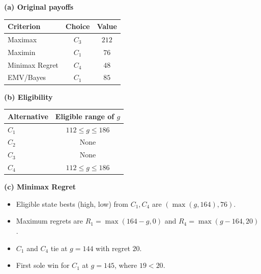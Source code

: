 {\noindent\begin{minipage}[t]{0.35\textwidth}
  \vspace{0pt}
  \textbf{(a) Original payoffs}\par\smallskip
  \setlength{\tabcolsep}{3pt}
  \begin{tabular}{@{}lcc@{}}
    \toprule
    Criterion & Choice & Value\\ \midrule
    Maximax & $C_3$ & $212$\\
    Maximin & $C_1$ & $76$\\
    Minimax Regret & $C_4$ & $48$\\
    EMV/Bayes & $C_1$ & $85$\\
    \bottomrule
  \end{tabular}
\end{minipage}\hfill
\begin{minipage}[t]{0.62\textwidth}
  \vspace{0pt}
  \textbf{(b) Eligibility}\par\smallskip
  \begin{tabular}{@{}lc@{}}
    \toprule
    Alternative & Eligible range of $g$\\ \midrule
    $C_1$ & $112\le g\le186$\\
    $C_2$ & None\\
    $C_3$ & None\\
    $C_4$ & $112\le g\le186$\\
    \bottomrule
  \end{tabular}\par\smallskip
  \textbf{(c) Minimax Regret}
  \begin{itemize}[leftmargin=*,nosep]
    \item Eligible state bests (high, low) from $C_1,C_4$ are $(\max(g,164),76)$.
    \item Maximum regrets are $R_1=\max(164-g,0)$ and $R_4=\max(g-164,20)$.
    \item $C_1$ and $C_4$ tie at $g=144$ with regret $20$.
    \item First sole win for $C_1$ at $\boxed{g=145}$, where $19<20$.
  \end{itemize}
\end{minipage}

}
